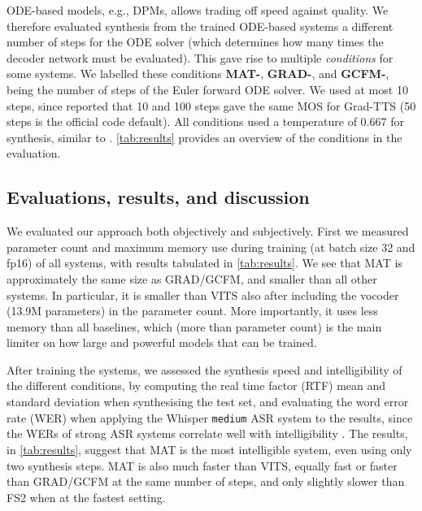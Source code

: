 \documentclass[british]{article}
\begin{document}
ODE-based models, e.g., DPMs, allows trading off speed against quality.
We therefore evaluated synthesis from the trained ODE-based systems a different number of steps for the ODE solver (which determines how many times the decoder network must be evaluated).
This gave rise to multiple \emph{conditions} for some systems.
We labelled these conditions \textbf{MAT-}, \textbf{GRAD-}, and \textbf{GCFM-},  being the number of steps of the Euler forward ODE solver.
We used at most 10 steps, since \cite{popov2021grad} reported that 10 and 100 steps gave the same MOS for Grad-TTS (50 steps is the official code default).
All conditions used a temperature of 0.667 for synthesis, similar to \cite{popov2021grad}.
\cref{tab:results} provides an overview of the conditions in the evaluation.




\subsection{Evaluations, results, and discussion}
\label{ssec:results}
We evaluated our approach both objectively and subjectively.
First we measured parameter count and maximum memory use during training (at batch size 32 and fp16) of all systems, with results tabulated in \cref{tab:results}.
We see that MAT is approximately the same size as GRAD/GCFM, and smaller than all other systems.
In particular, it is smaller than VITS also after including the vocoder (13.9M parameters) in the parameter count.
More importantly, it uses less memory than all baselines, which (more than parameter count) is the main limiter on how large and powerful models that can be trained.

After training the systems, we assessed the synthesis speed and intelligibility of the different conditions, by computing the real time factor (RTF) mean and standard deviation when synthesising the test set, and evaluating the word error rate (WER) when applying the Whisper \texttt{medium}
\cite{radford2023robust} ASR system to the results, since the WERs of strong ASR systems correlate well with intelligibility \cite{taylor2021confidence}.
The results, in \cref{tab:results}, suggest that MAT is the most intelligible system, even using only two synthesis steps.
MAT is also much faster than VITS, equally fast or faster than GRAD/GCFM at the same number of steps, and only slightly slower than FS2 when at the fastest setting.
\end{document}
